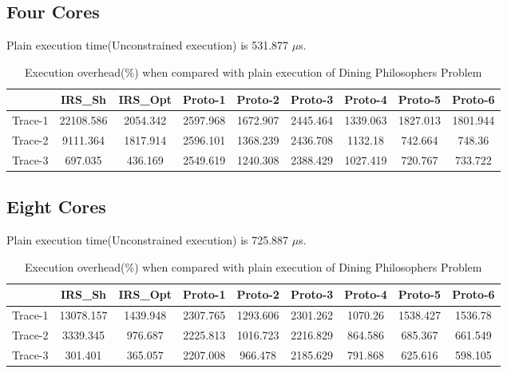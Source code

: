 \subsection{Four Cores}
Plain execution time(Unconstrained execution) is 531.877 $\mu$s.
\begin{table}[h]
\begin{center}
 \begin{tabular}{|c c c c c c c c c|} 
 \hline
 & IRS\_Sh & IRS\_Opt& Proto-1 & Proto-2 & Proto-3 & Proto-4 & Proto-5 & Proto-6\\ %
 \hline
Trace-1 & 22108.586 & 2054.342 & 2597.968 & 1672.907 & 2445.464 & 1339.063 & 1827.013 & 1801.944\\
Trace-2 & 9111.364 & 1817.914 & 2596.101 & 1368.239 & 2436.708 & 1132.18 & 742.664 & 748.36\\
Trace-3 & 697.035 & 436.169 & 2549.619 & 1240.308 & 2388.429 & 1027.419 & 720.767 & 733.722\\
\hline
\end{tabular}
\end{center}
\caption{Execution overhead(\%) when compared with plain execution of Dining Philosophers Problem}
\label{dining_phil_irs_res_cores_4}
\end{table}

\subsection{Eight Cores}
Plain execution time(Unconstrained execution) is 725.887 $\mu$s.
\begin{table}[h]
\begin{center}
 \begin{tabular}{|c c c c c c c c c|} 
 \hline
 & IRS\_Sh & IRS\_Opt& Proto-1 & Proto-2 & Proto-3 & Proto-4 & Proto-5 & Proto-6\\ %
 \hline
Trace-1 & 13078.157 & 1439.948 & 2307.765 & 1293.606 & 2301.262 & 1070.26 & 1538.427 & 1536.78\\
Trace-2 & 3339.345 & 976.687 & 2225.813 & 1016.723 & 2216.829 & 864.586 & 685.367 & 661.549\\
Trace-3 & 301.401 & 365.057 & 2207.008 & 966.478 & 2185.629 & 791.868 & 625.616 & 598.105\\
\hline
\end{tabular}
\end{center}
\caption{Execution overhead(\%) when compared with plain execution of Dining Philosophers Problem}
\label{dining_phil_irs_res_cores_8}
\end{table}

